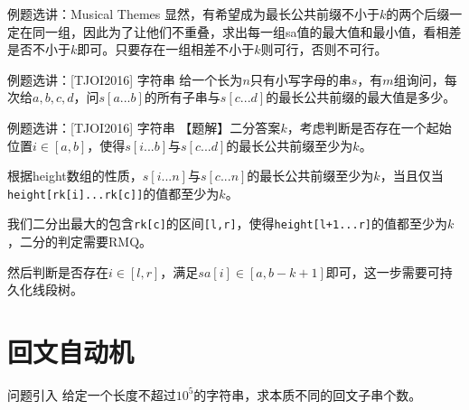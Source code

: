 \documentclass{beamer}
\begin{document}
\begin{frame}[fragile]{例题选讲：Musical Themes}
\small
    显然，有希望成为最长公共前缀不小于$k$的两个后缀一定在同一组，因此为了让他们不重叠，求出每一组sa值的最大值和最小值，看相差是否不小于$k$即可。只要存在一组相差不小于$k$则可行，否则不可行。
\end{frame}

\begin{frame}[fragile]{例题选讲：[TJOI2016] 字符串}
\small
    给一个长为$n$只有小写字母的串$s$，有$m$组询问，每次给$a,b,c,d$，问$s[a...b]$的所有子串与$s[c...d]$的最长公共前缀的最大值是多少。
\end{frame}

\begin{frame}[fragile]{例题选讲：[TJOI2016] 字符串}
\small
    【题解】二分答案$k$，考虑判断是否存在一个起始位置$i\in[a,b]$，使得$s[i...b]$与$s[c...d]$的最长公共前缀至少为$k$。

    \vspace{1em}\pause
    根据height数组的性质，$s[i...n]$与$s[c...n]$的最长公共前缀至少为$k$，当且仅当\verb|height[rk[i]...rk[c]]|的值都至少为$k$。

    \vspace{1em}\pause
    我们二分出最大的包含\verb|rk[c]|的区间\verb|[l,r]|，使得\verb|height[l+1...r]|的值都至少为$k$，二分的判定需要RMQ。

    \vspace{1em}\pause
    然后判断是否存在$i\in[l,r]$，满足$sa[i]\in[a,b-k+1]$即可，这一步需要可持久化线段树。
\end{frame}

\section{回文自动机}

\begin{frame}{问题引入}
    \small
    给定一个长度不超过$10^5$的字符串，求本质不同的回文子串个数。
\end{frame}
\end{document}
